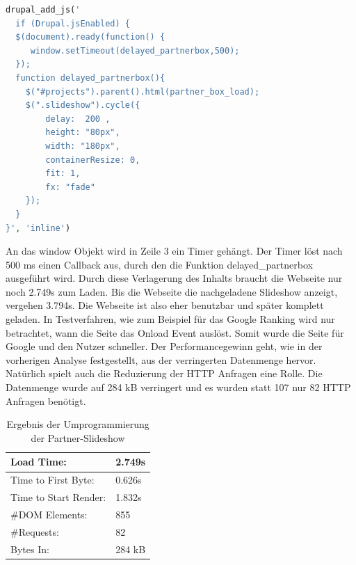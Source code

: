 \begin{minipage}[t]{1\textwidth}
\begin{lstlisting}[language=php,label=Javascript - Slideshow,caption=Javascript - Slideshow]
drupal_add_js('
  if (Drupal.jsEnabled) {
  $(document).ready(function() {
     window.setTimeout(delayed_partnerbox,500);
  });
  function delayed_partnerbox(){
	$("#projects").parent().html(partner_box_load);
	$(".slideshow").cycle({
	    delay:  200 ,
	    height: "80px",
	    width: "180px",
	    containerResize: 0,
	    fit: 1,
	    fx: "fade"
	});
  }
}', 'inline')
\end{lstlisting}
\end{minipage}
An das window Objekt wird in Zeile 3 ein Timer gehängt. Der Timer löst nach 500 ms einen Callback aus, durch den die Funktion delayed\_partnerbox ausgeführt wird. Durch diese Verlagerung des Inhalts braucht die Webseite nur noch 2.749s zum Laden. Bis die Webseite die nachgeladene Slideshow anzeigt, vergehen 3.794s. Die Webseite ist also eher benutzbar und später komplett geladen. In Testverfahren, wie zum Beispiel für das Google Ranking wird nur betrachtet, wann die Seite das Onload Event auslöst. Somit wurde die Seite für Google und den Nutzer schneller. Der Performancegewinn geht, wie in der vorherigen Analyse festgestellt, aus der verringerten Datenmenge hervor. Natürlich spielt auch die Reduzierung der HTTP Anfragen eine Rolle. Die Datenmenge wurde auf 284 kB verringert und es wurden statt 107 nur 82 HTTP Anfragen benötigt.

\begin{table}[!ht]
\centering
\caption{Ergebnis der Umprogrammierung der Partner-Slideshow}
    \begin{tabular}{ | p{3cm} | p{1.5cm} | }
    \hline
    Load Time: 			& 2.749s 	\\ \hline
    Time to First Byte:		& 0.626s  	\\ \hline
    Time to Start Render:	& 1.832s	\\ \hline
    \#DOM Elements:		& 855 		\\ \hline
    \#Requests:			& 82 		\\ \hline
    Bytes In:			& 284 kB 	\\ \hline
    \hline
    \end{tabular}
\end{table}


